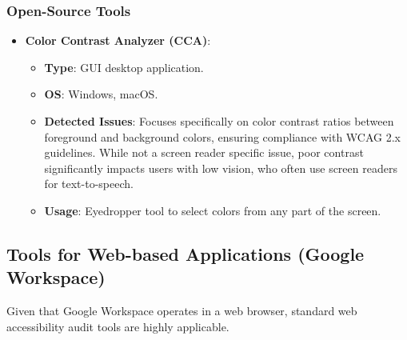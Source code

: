 \subsubsection{Open-Source Tools}
\begin{itemize}
    \item \textbf{Color Contrast Analyzer (CCA)}\cite{CCA}:
        \begin{itemize}
            \item \textbf{Type}: GUI desktop application.
            \item \textbf{OS}: Windows, macOS.
            \item \textbf{Detected Issues}: Focuses specifically on color contrast ratios between foreground and background colors, ensuring compliance with WCAG 2.x guidelines. While not a screen reader specific issue, poor contrast significantly impacts users with low vision, who often use screen readers for text-to-speech.
            \item \textbf{Usage}: Eyedropper tool to select colors from any part of the screen.
        \end{itemize}
\end{itemize}

\subsection{Tools for Web-based Applications (Google Workspace)}

Given that Google Workspace operates in a web browser, standard web accessibility audit tools are highly applicable.

